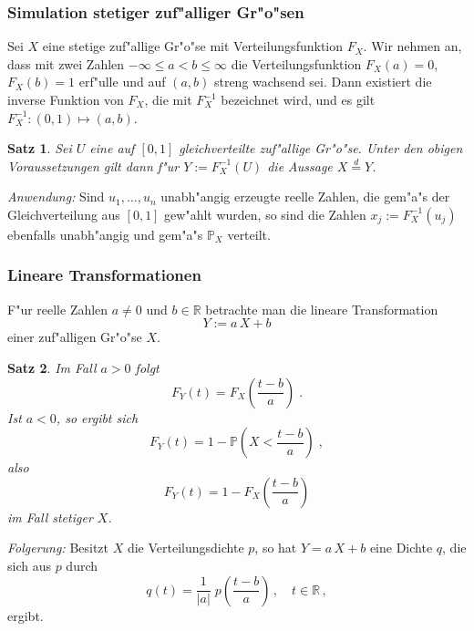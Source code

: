 \documentclass[ngerman,draft,parskip=half,twoside]{scrartcl}
\newtheorem{thm}{Satz}[section]
\newcommand*{\R}{\mathbb{R}}      %
\newcommand*{\WKM}{\mathbb{P}}      %
\begin{document}
\subsubsection{Simulation stetiger zuf"alliger Gr"o"sen}
Sei $X$ eine stetige zuf"allige Gr"o"se mit Verteilungsfunktion $F_X$. Wir nehmen an,
dass mit zwei Zahlen
$-\infty\le a<b\le\infty$ die Verteilungsfunktion $F_X(a)=0$, $F_X(b)=1$ erf"ulle  und
auf $(a,b)$ streng wachsend sei. Dann
existiert die inverse Funktion von $F_X$, die mit $F_X^{-1}$ bezeichnet wird, und es
gilt $F_X^{-1}\colon(0,1)\mapsto (a,b)$.
\begin{thm}
Sei $U$ eine auf $[0,1]$ gleichverteilte zuf"allige Gr"o"se. Unter den
obigen Voraussetzungen gilt dann f"ur $Y:=F_X^{-1}(U)$ die Aussage
$X\stackrel{d}{=} Y$.
\end{thm}
\textit{Anwendung:} Sind $u_1,\ldots,u_n$ unabh"angig erzeugte reelle Zahlen, die gem"a"s der
Gleichverteilung aus $[0,1]$ gew"ahlt wurden, so sind die Zahlen $x_j:= F_X^{-1}(u_j)$ ebenfalls unabh"angig
und gem"a"s $\WKM_X$ verteilt.
\subsubsection{Lineare Transformationen}
F"ur reelle Zahlen $a\not=0$ und $b\in\R$ betrachte man die lineare Transformation
$$
Y:=a\,X+ b
$$
einer zuf"alligen Gr"o"se $X$.
\begin{thm}
Im Fall $a>0$ folgt
$$
F_Y(t)=F_X\left(\frac{t-b}{a}\right)\;.
$$
Ist $a<0$, so ergibt sich
$$
F_Y(t)=1-\WKM\left(X<\frac{t-b}{a}\right)\;,
$$
also
$$
F_Y(t)=1-F_X\left(\frac{t-b}{a}\right)
$$
im Fall stetiger $X$.
\end{thm}
\textit{Folgerung:} Besitzt $X$ die Verteilungsdichte $p$, so hat $Y=a\,X+b$ eine Dichte $q$,
die sich aus $p$ durch
$$
q(t)=\frac{1}{|a|}\;p\left(\frac{t-b}{a}\right)\,,\quad t\in\R\,,
$$
ergibt.
\end{document}
